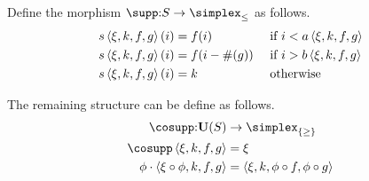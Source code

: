 \documentclass[csh.tex]{subfiles}
\begin{document}
\begin{definition}
Define the morphism $\supp \of S\to \simplex_{\leq}$ as follows.
\begin{align*}
s\left\langle \xi,k,f,g \right\rangle(i) &= f(i)&&\textrm{ if } i < a\left\langle \xi,k,f,g \right\rangle\\
s\left\langle \xi,k,f,g \right\rangle(i) &= f(i-\#(g))&&\textrm{ if } i > b\left\langle \xi,k,f,g \right\rangle\\
s\left\langle \xi,k,f,g \right\rangle(i) &= k&&\textrm{ otherwise }
\end{align*}

The remaining structure can be define as follows.
\begin{align*}
\cosupp\of\base(S)&\to\simplex_{\set\geq}\\
\cosupp\tuplet{\xi,k,f,g} &= \xi\\
\phi\cdot\tuplet{\xi\circ \phi,k,f,g} &= \tuplet{\xi,k,\phi\circ f, \phi\circ g}
\end{align*}
\end{definition}
\end{document}
